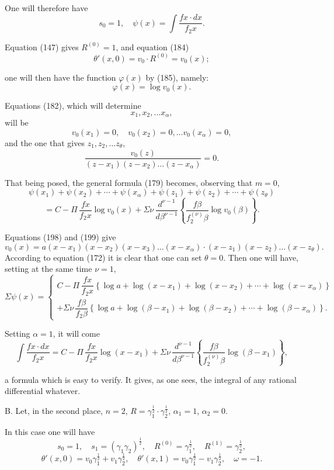 \documentclass{article}
\begin{document}
One will therefore have
\[ s_0 = 1, \quad \psi(x) = \int \frac{f x \cdot dx}{f_2 x}. \]

Equation (147) gives $R^{(0)} = 1$, and equation (184)
\[ \theta'(x,0) = v_0 \cdot R^{(0)} = v_0(x); \]

one will then have the function $\varphi(x)$ by (185), namely:
\[ \varphi(x) = \log v_0(x). \]

Equations (182), which will determine
\[ x_1, x_2, \ldots x_\alpha, \]
will be
\[ v_0(x_1) = 0, \quad v_0(x_2) = 0, \ldots v_0(x_\alpha) = 0, \tag{198} \]
and the one that gives $z_1, z_2, \ldots z_\theta$,
\[ \frac{v_0(z)}{(z-x_1)(z-x_2) \ldots (z-x_\alpha)} = 0. \tag{199} \]

That being posed, the general formula (179) becomes, observing that $m = 0$,
\[ \psi(x_1)+\psi(x_2)+\cdots+\psi(x_\alpha)+\psi(z_1)+\psi(z_2)+\cdots+\psi(z_\theta) \]
\[ = C - \Pi\,\frac{f x}{f_2 x}\log v_0(x) + \Sigma\nu\,\frac{d^{\nu-1}}{d\beta^{\nu-1}} \left\{ \frac{f\beta}{f_2^{(\nu)}\beta}\log v_0(\beta) \right\}. \tag{200} \]

Equations (198) and (199) give
\[ v_0(x) = a(x-x_1)(x-x_2)(x-x_3) \ldots (x-x_\alpha) \cdot (x-z_1)(x-z_2) \ldots (x-z_\theta). \]
According to equation (172) it is clear that one can set $\theta = 0$. Then one will have, setting at the same time $\nu = 1$,
\[ \Sigma\psi(x) = \begin{cases}
C-\Pi\,\dfrac{f x}{f_2 x}\left\{\log a+\log(x-x_1)+\log(x-x_2)+\cdots+\log(x-x_\alpha)\right\} \\
+ \Sigma\nu\,\dfrac{f\beta}{f_2\beta}\left\{\log a+\log(\beta-x_1)+\log(\beta-x_2)+\cdots+\log(\beta-x_\alpha)\right\}.
\end{cases} \]

Setting $\alpha = 1$, it will come
\[ \int \frac{f x \cdot dx}{f_2 x} = C - \Pi\,\frac{f x}{f_2 x}\log(x-x_1) + \Sigma\nu\,\frac{d^{\nu-1}}{d\beta^{\nu-1}} \left\{ \frac{f\beta}{f_2^{(\nu)}\beta}\log(\beta-x_1) \right\}, \tag{201} \]

a formula which is easy to verify. It gives, as one sees, the integral of any rational differential whatever.

B. Let, in the second place, $n = 2$, $R = \gamma_1^{\frac{1}{2}} \cdot \gamma_2^{\frac{1}{2}}$, $\alpha_1 = 1$, $\alpha_2 = 0$.

In this case one will have
\[ s_0 = 1, \quad s_1 = (\gamma_1\gamma_2)^{\frac{1}{2}}, \quad R^{(0)} = \gamma_1^{\frac{1}{2}}, \quad R^{(1)} = \gamma_2^{\frac{1}{2}}, \]
\[ \theta'(x,0) = v_0\gamma_1^{\frac{1}{2}}+v_1\gamma_2^{\frac{1}{2}}, \quad \theta'(x,1) = v_0\gamma_1^{\frac{1}{2}}-v_1\gamma_2^{\frac{1}{2}}, \quad \omega = -1. \]
\end{document}
